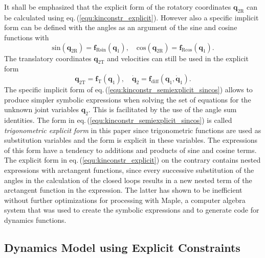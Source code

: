 \documentclass{svproc}
\newcommand{\bm}[1]{\boldsymbol{#1}}
\begin{document}
It shall be emphasized that the explicit form of the rotatory coordinates $\bm{q}_{2\mathrm{R}}$ can be calculated using eq.\,(\ref{equ:kinconstr_explicit}).
However also a specific implicit form can be defined with the angles as an argument of the sine and cosine functions with
%
\begin{equation}
\mathrm{sin}(\bm{q}_{2\mathrm{R}}) = \bm{f}_{\mathrm{R}\mathrm{sin}}(\bm{q}_1),
\quad
\mathrm{cos}(\bm{q}_{2\mathrm{R}}) = \bm{f}_{\mathrm{R}\mathrm{cos}}(\bm{q}_1). \label{equ:kinconstr_semiexplicit_sincos}
\end{equation}
%
The translatory coordinates $\bm{q}_{2\mathrm{T}}$ and velocities can still be used in the explicit form
%
\vspace{-0.2cm}
\begin{equation}
\bm{q}_{2\mathrm{T}} = \bm{f}_{\mathrm{T}}(\bm{q}_{1}),
\quad
\dot{\bm{q}}_{2} = \bm{f}_{\mathrm{diff}}(\bm{q}_{1},\dot{\bm{q}}_{1}). \label{equ:kinconstr_semiexplicit_diff_transl}
\end{equation}
%
The specific implicit form of eq.\,(\ref{equ:kinconstr_semiexplicit_sincos}) allows to produce simpler symbolic expressions when solving the set of equations for the unknown joint variables $\bm{q}_{2}$.
This is facilitated by the use of the angle sum identities.
The form in eq.\,(\ref{equ:kinconstr_semiexplicit_sincos}) is called \emph{trigonometric explicit form} in this paper since trigonometric functions are used as substitution variables and the form is explicit in these variables.
The expressions of this form have a tendency to additions and products of sine and cosine terms.
The explicit form in eq.\,(\ref{equ:kinconstr_explicit}) on the contrary contains nested expressions with arctangent functions, since every successive substitution of the angles in the calculation of the closed loops results in a new nested term of the arctangent function in the expression.
The latter has shown to be inefficient without further optimizations for processing with Maple, a computer algebra system that was used to create the symbolic expressions and to generate code for dynamics functions. %

\subsection{Dynamics Model using Explicit Constraints}
\label{sec:Lagrange2Elim}
\end{document}

